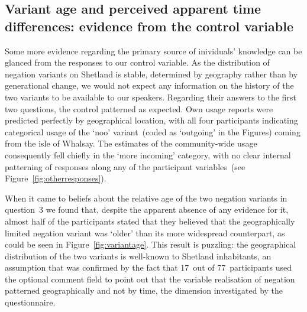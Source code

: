 


\subsection[Variant age and perceived apparent time differences]{Variant age and perceived apparent time differences: evidence from the control variable}

Some more evidence regarding the primary source of inividuals' knowledge can be glanced from the responses to our control variable. As the distribution of negation variants on Shetland is stable, determined by geography rather than by generational change, we would not expect any information on the history of the two variants to be available to our speakers.
Regarding their answers to the first two questions, the control patterned as expected. Own usage reports were predicted perfectly by geographical location, with all four participants indicating categorical usage of the `noo' variant~(coded as `outgoing' in the Figures) coming from the isle of Whalsay. The estimates of the community-wide usage consequently fell chiefly in the `more incoming' category, with no clear internal patterning of responses along any of the participant variables~(see Figure~\ref{fig:otherresponses}).



When it came to beliefs about the relative age of the two negation variants in question~3 we found that, despite the apparent absence of any evidence for it, almost half of the participants stated that they believed that the geographically limited negation variant was `older' than its more widespread counterpart, as could be seen in Figure~\ref{fig:variantage}.
This result is puzzling: the geographical distribution of the two variants is well-known to Shetland inhabitants, an assumption that was confirmed by the fact that 17~out of 77~participants used the optional comment field to point out that the variable realisation of negation patterned geographically and not by time, the dimension investigated by the questionnaire. %

